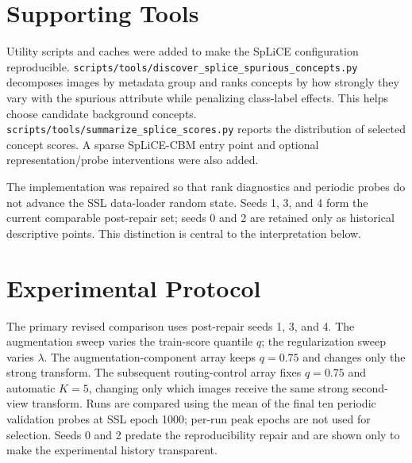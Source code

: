 \documentclass[11pt,a4paper]{article}
\begin{document}
\section{Supporting Tools}

Utility scripts and caches were added to make the SpLiCE configuration reproducible.
\texttt{scripts/tools/discover\_splice\_spurious\_concepts.py} decomposes images by
metadata group and ranks concepts by how strongly they vary with the spurious
attribute while penalizing class-label effects. This helps choose candidate
background concepts. \texttt{scripts/tools/summarize\_splice\_scores.py} reports the
distribution of selected concept scores. A sparse SpLiCE-CBM entry point and optional
representation/probe interventions were also added.

The implementation was repaired so that rank diagnostics and periodic probes
do not advance the SSL data-loader random state. Seeds 1, 3, and 4 form the
current comparable post-repair set; seeds 0 and 2 are retained only as
historical descriptive points. This distinction is central to the interpretation
below.

\section{Experimental Protocol}

The primary revised comparison uses post-repair seeds 1, 3, and 4. The
augmentation sweep varies the train-score quantile $q$; the regularization sweep
varies $\lambda$. The augmentation-component array keeps $q=0.75$ and changes
only the strong transform. The subsequent routing-control array fixes $q=0.75$
and automatic $K=5$, changing only which images receive the same strong
second-view transform. Runs are compared using the mean of the final ten
periodic validation probes at SSL epoch 1000; per-run peak epochs are not used
for selection. Seeds 0 and 2 predate the reproducibility repair and are shown
only to make the experimental history transparent.
\end{document}
